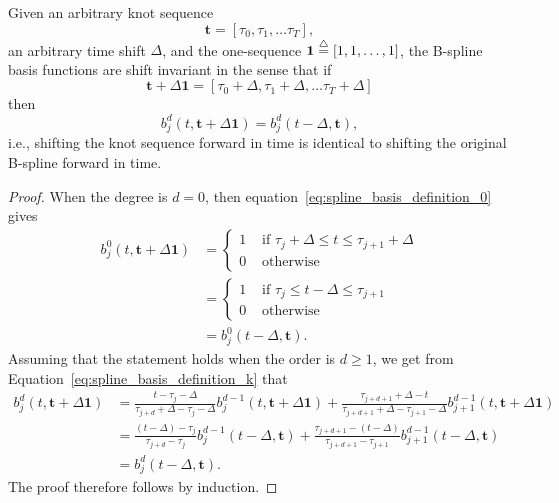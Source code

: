 \begin{lemma} \label{lem:basis_are_shift_invariant}
Given an arbitrary knot sequence
\[
\mathbf{t} = [\tau_0, \tau_1, \dots \tau_T],
\]
an arbitrary time shift $\Delta$, and the one-sequence $\mathbf{1}\stackrel{\triangle}{=}[1, 1, \dots, 1]$, the B-spline basis functions are shift invariant in the sense that
if 
\[
\mathbf{t} + \Delta\mathbf{1} = [\tau_0+\Delta, \tau_1+\Delta, \dots \tau_T+\Delta]
\]
then
\[
b_j^d(t,  \mathbf{t}+\Delta\mathbf{1}) = b_j^d(t-\Delta, \mathbf{t}),
\]
i.e., shifting the knot sequence forward in time is identical to shifting the original B-spline forward in time.
\end{lemma}
\begin{proof}
When the degree is $d=0$, then equation~\eqref{eq:spline_basis_definition_0} gives
\begin{align*}
	b_j^0(t,  \mathbf{t}+\Delta\mathbf{1}) 
		&= \begin{cases} 1 & \text{~if~} \tau_j+\Delta \leq t \leq \tau_{j+1}+\Delta \\ 
 						 0 & \text{~otherwise} 
 		   \end{cases} \\
 		&= \begin{cases} 1 & \text{~if~} \tau_j \leq t-\Delta \leq \tau_{j+1} \\ 
 						 0 & \text{~otherwise} 
 		    \end{cases} \\ 	
 		&= b_j^0(t-\Delta, \mathbf{t}).
\end{align*}
Assuming that the statement holds when the order is $d\geq 1$, we get from 
Equation~\eqref{eq:spline_basis_definition_k} that
\begin{align*}
b_j^d(t,  \mathbf{t}+\Delta\mathbf{1}) &= \frac{t-\tau_j-\Delta}{\tau_{j+d}+\Delta-
\tau_j-\Delta} b_j^{d-1}(t,  \mathbf{t}+\Delta\mathbf{1}) + \frac{\tau_{j+d+1}+\Delta-t}{\tau_{j+d+1}+\Delta-\tau_{j+1}-\Delta} b_{j+1}^{d-1}(t,  \mathbf{t}+\Delta\mathbf{1}) \\
&= \frac{(t-\Delta)-\tau_j}{\tau_{j+d}-
\tau_j} b_j^{d-1}(t-\Delta, \mathbf{t}) + \frac{\tau_{j+d+1}-(t-\Delta)}{\tau_{j+d+1}-\tau_{j+1}} b_{j+1}^{d-1}(t-\Delta, \mathbf{t}) \\
&= b_j^d(t-\Delta, \mathbf{t}).
\end{align*}
The proof therefore follows by induction.
\end{proof}


